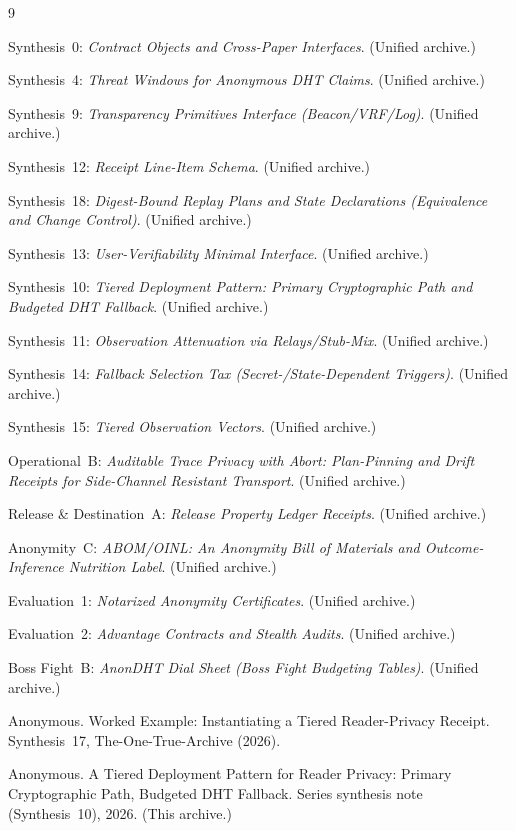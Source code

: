 \documentclass[11pt]{article}
\begin{document}
\begin{thebibliography}{9}

Synthesis~0: \emph{Contract Objects and Cross-Paper Interfaces}. (Unified archive.)

Synthesis~4: \emph{Threat Windows for Anonymous DHT Claims}. (Unified archive.)

Synthesis~9: \emph{Transparency Primitives Interface (Beacon/VRF/Log)}. (Unified archive.)

Synthesis~12: \emph{Receipt Line-Item Schema}. (Unified archive.)

Synthesis~18: \emph{Digest-Bound Replay Plans and State Declarations (Equivalence and Change Control)}. (Unified archive.)

Synthesis~13: \emph{User-Verifiability Minimal Interface}. (Unified archive.)

Synthesis~10: \emph{Tiered Deployment Pattern: Primary Cryptographic Path and Budgeted DHT Fallback}. (Unified archive.)

Synthesis~11: \emph{Observation Attenuation via Relays/Stub-Mix}. (Unified archive.)

Synthesis~14: \emph{Fallback Selection Tax (Secret-/State-Dependent Triggers)}. (Unified archive.)

Synthesis~15: \emph{Tiered Observation Vectors}. (Unified archive.)

Operational~B: \emph{Auditable Trace Privacy with Abort: Plan-Pinning and Drift Receipts for Side-Channel Resistant Transport}. (Unified archive.)

Release \& Destination~A: \emph{Release Property Ledger Receipts}. (Unified archive.)

Anonymity~C: \emph{ABOM/OINL: An Anonymity Bill of Materials and Outcome-Inference Nutrition Label}. (Unified archive.)

Evaluation~1: \emph{Notarized Anonymity Certificates}. (Unified archive.)

Evaluation~2: \emph{Advantage Contracts and Stealth Audits}. (Unified archive.)

Boss Fight~B: \emph{AnonDHT Dial Sheet (Boss Fight Budgeting Tables)}. (Unified archive.)


Anonymous.
\newblock Worked Example: Instantiating a Tiered Reader-Privacy Receipt.
\newblock Synthesis~17, The-One-True-Archive (2026).


Anonymous.
\newblock A Tiered Deployment Pattern for Reader Privacy: Primary Cryptographic Path, Budgeted DHT Fallback.
\newblock Series synthesis note (Synthesis~10), 2026. (This archive.)

\end{thebibliography}
\end{document}
